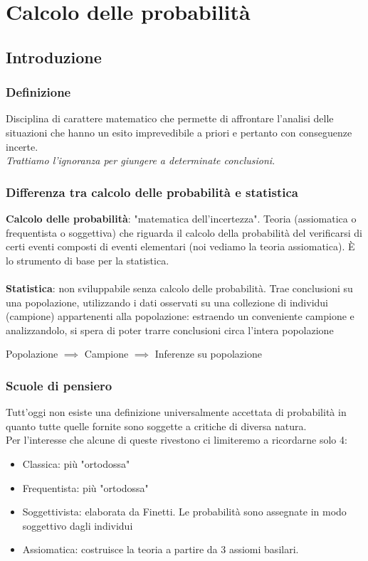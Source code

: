 \chapter[Calcolo delle probabilità]{Calcolo delle probabilità}
\section{Introduzione}
\subsection{Definizione}
Disciplina di carattere matematico che permette di affrontare l’analisi delle situazioni che hanno un esito imprevedibile a priori e pertanto con conseguenze incerte. \\
\textit{Trattiamo l'ignoranza per giungere a determinate conclusioni}.
\subsection{Differenza tra calcolo delle probabilità e statistica}
\textbf{Calcolo delle probabilità}: "matematica dell'incertezza". Teoria (assiomatica o frequentista o soggettiva) che riguarda il calcolo della probabilità del verificarsi di certi eventi composti di eventi elementari (noi vediamo la teoria assiomatica). È lo strumento di base per la statistica. \\ \\
\textbf{Statistica}: non sviluppabile senza calcolo delle probabilità. Trae conclusioni su una popolazione, utilizzando i dati osservati su una collezione di individui (campione) appartenenti alla popolazione: estraendo un conveniente campione e analizzandolo, si spera di poter trarre conclusioni circa l’intera popolazione \\
\begin{center}
	Popolazione $\implies$ Campione $\implies$ Inferenze su popolazione
\end{center}

\subsection{Scuole di pensiero}
Tutt'oggi non esiste una definizione universalmente accettata di probabilità in quanto tutte quelle fornite sono soggette a critiche di diversa natura. \\
Per l’interesse che alcune di queste rivestono ci limiteremo a ricordarne solo 4:
\begin{itemize}
	\item Classica: più "ortodossa"
	\item Frequentista: più "ortodossa"
	\item Soggettivista: elaborata da Finetti. Le probabilità sono assegnate in modo soggettivo dagli individui
	\item Assiomatica: costruisce la teoria a partire da 3 assiomi basilari.
\end{itemize}

